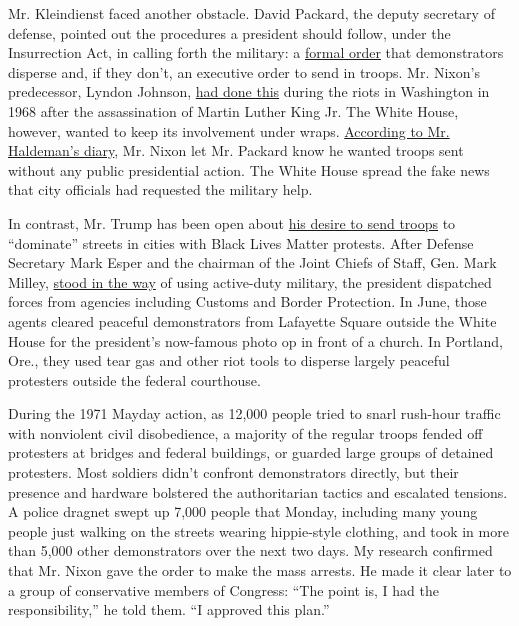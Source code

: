 Mr. Kleindienst faced another obstacle. David Packard, the deputy
secretary of defense, pointed out the procedures a president should
follow, under the Insurrection Act, in calling forth the military: a
\href{https://www.everycrsreport.com/files/20060814_RS22266_c6617a8c1fc8c51828f9ab4d4a42de8366358c24.pdf}{formal
order} that demonstrators disperse and, if they don't, an executive
order to send in troops. Mr. Nixon's predecessor, Lyndon Johnson,
\href{https://history.army.mil/html/books/030/30-20/CMH_Pub_30-20.pdf}{had
done this} during the riots in Washington in 1968 after the
assassination of Martin Luther King Jr. The White House, however, wanted
to keep its involvement under wraps.
\href{https://www.nixonlibrary.gov/sites/default/files/virtuallibrary/documents/haldeman-diaries/37-hrhd-audiotape-ac07b-19710430-pa.pdf}{According
to Mr. Haldeman's diary}, Mr. Nixon let Mr. Packard know he wanted
troops sent without any public presidential action. The White House
spread the fake news that city officials had requested the military
help.

In contrast, Mr. Trump has been open about
\href{https://www.washingtonpost.com/opinions/2020/06/05/how-trump-came-brink-deploying-active-duty-troops-washington/}{his
desire to send troops} to ``dominate'' streets in cities with Black
Lives Matter protests. After Defense Secretary Mark Esper and the
chairman of the Joint Chiefs of Staff, Gen. Mark Milley,
\href{https://www.nytimes.com/2020/06/04/us/politics/trump-military-protests.html}{stood
in the way} of using active-duty military, the president dispatched
forces from agencies including Customs and Border Protection. In June,
those agents cleared peaceful demonstrators from Lafayette Square
outside the White House for the president's now-famous photo op in front
of a church. In Portland, Ore., they used tear gas and other riot tools
to disperse largely peaceful protesters outside the federal courthouse.

During the 1971 Mayday action, as 12,000 people tried to snarl rush-hour
traffic with nonviolent civil disobedience, a majority of the regular
troops fended off protesters at bridges and federal buildings, or
guarded large groups of detained protesters. Most soldiers didn't
confront demonstrators directly, but their presence and hardware
bolstered the authoritarian tactics and escalated tensions. A police
dragnet swept up 7,000 people that Monday, including many young people
just walking on the streets wearing hippie-style clothing, and took in
more than 5,000 other demonstrators over the next two days. My research
confirmed that Mr. Nixon gave the order to make the mass arrests. He
made it clear later to a group of conservative members of Congress:
``The point is, I had the responsibility,'' he told them. ``I approved
this plan.''

